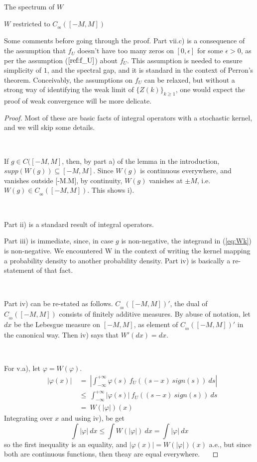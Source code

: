 \documentclass[12pt]{article}
\newenvironment{remark}[1][Remark]{\begin{trivlist}
		\item[\hskip \labelsep {\bfseries #1}]}{\end{trivlist}}
\begin{document}
\begin{section}{The spectrum of $W$ }
\begin{subsection}{$W$ restricted to $C_{_{0\!0}}([-M,M])$}
\begin{remark} Some comments before going through the proof. Part vii.c) is a consequence of the assumption that $f_U$ doesn't have too many zeros on $[0,\epsilon]$ for some $\epsilon > 0$, as per the assumption ($\ref{ref:f_U}$) about $f_U$. This assumption is needed to ensure simplicity of $1$, and the spectral gap, and it is standard in the context of Perron's theorem. Conceivably, the assumptions on $f_U$ can be relaxed, but without a strong way of identifying the weak limit of $\{Z(k)\}_{k \ge 1}$, one would expect the proof of weak convergence will be more delicate.
\end{remark}

\begin{proof} 
	Most of these are basic facts of integral operators with a stochastic kernel, and we will skip some details.
	\  
	
	\    
	
	If $g \in C([-M,M]$, then, by part a) of the lemma in the introduction, $supp(W(g)) \subseteq [-M,M]$. Since $W(g)$ is continuous everywhere, and vanishes outside [-M.M], by continuity, $W(g)$ vanishes at $\pm M$, i.e. $W(g) \in C_{_{00}}([-M,M])$. This shows i).
	\  
	
	\   

	Part ii) is a standard result of integral operators. 
	
	Part iii) is immediate, since, in case $g$ is non-negative, the integrand in (\ref{eq:Wk}) is non-negative. 
	We encountered W in the context of writing the kernel mapping a probability density to another probability density. Part iv) is basically a re-statement of that fact. 
	\  
	
	\    


	Part iv) can be re-stated as follows. $C_{_{00}}([-M,M])'$, the dual 
	of $C_{_{00}}([-M,M])$ consists of finitely additive measures. By abuse of notation, let $dx$ be the Lebesgue measure on $[-M,M]$, as element of $C_{_{00}}([-M,M])'$ in the canonical way. Then iv) says that $W'(dx) = dx$.  
	\  
	
	\   

	For v.a), let $\varphi = W(\varphi)$. 
	\begin{align*}
&&	|\varphi(x)| &~=~ \left| \int_{-\infty}^{+\infty} \varphi(s)\ f_U\!\left(  \left(s - x \right)\ sign(s) \right) \ ds \right| &\\
&&	&~\le~ 
	  \int_{-\infty}^{+\infty} \left| \varphi(s) \right| \ f_U\!\left(  \left(s - x \right)\ sign(s) \right) \ ds  & \\
&& &~=~ W(|\varphi|)(x)  &
	\end{align*}
Integrating over $x$ and using iv), be get
$$
\int |\varphi| \ dx \le \int W(|\varphi|) \ dx = \int |\varphi| \ dx 
$$	
so the first inequality is an equality, and $|\varphi(x)| = W(|\varphi|)(x)$ a.e., but since both are continuous functions, then theay are equal everywhere.
	\  
\  
  

\end{proof}
\end{subsection}
\end{section}
\end{document}
